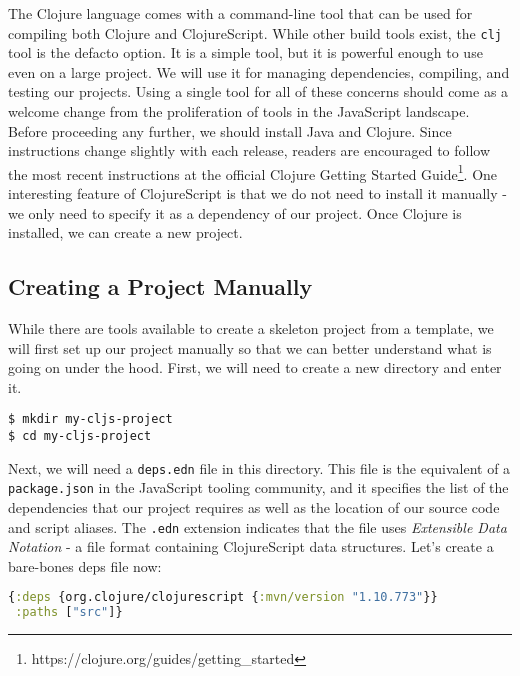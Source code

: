 \documentclass[10pt,twoside,openright]{memoir}
\begin{document}
The Clojure language comes with a command-line tool that can be used for
compiling both Clojure and ClojureScript. While other build tools exist,
the \texttt{clj} tool is the defacto option. It is a simple tool, but it
is powerful enough to use even on a large project. We will use it for
managing dependencies, compiling, and testing our projects. Using a
single tool for all of these concerns should come as a welcome change
from the proliferation of tools in the JavaScript landscape. Before
proceeding any further, we should install Java and Clojure. Since
instructions change slightly with each release, readers are encouraged
to follow the most recent instructions at the official
Clojure Getting Started Guide\footnote{https://clojure.org/guides/getting\_started}. One interesting feature of ClojureScript is that we do
not need to install it manually - we only need to specify it as a
dependency of our project. Once Clojure is installed, we can create a
new project.

\subsection{Creating a Project Manually}

While there are tools available to create a skeleton project from a
template, we will first set up our project manually so that we can
better understand what is going on under the hood. First, we will need
to create a new directory and enter it.

\begin{verbatim}
$ mkdir my-cljs-project
$ cd my-cljs-project
\end{verbatim}

Next, we will need a \texttt{deps.edn} file in this directory. This file
is the equivalent of a \texttt{package.json} in the JavaScript tooling
community, and it specifies the list of the dependencies that our
project requires as well as the location of our source code and script
aliases. The \texttt{.edn} extension indicates that the file uses
\emph{Extensible Data Notation} - a file format containing ClojureScript
data structures. Let's create a bare-bones deps file now:

\begin{lstlisting}[language=Clojure, caption={deps.edn}]
{:deps {org.clojure/clojurescript {:mvn/version "1.10.773"}}
 :paths ["src"]}
\end{lstlisting}
\end{document}

